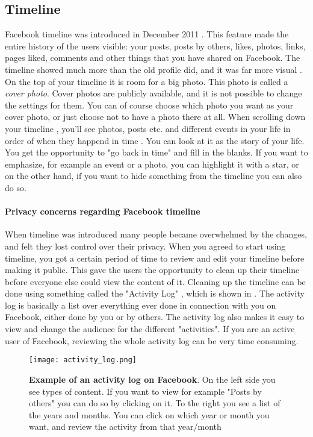 \subsection{Timeline}
\label{timeline}
Facebook timeline was introduced in December 2011 \cite{EvolutionOfFacebook}. This feature made the entire history of the users visible: your posts, posts by others, likes, photos, links, pages liked, comments and other things that you have shared on Facebook. The timeline showed much more than the old profile did, and it was far more visual \cite{timeline}. On the top of your timeline it is room for a big photo. This photo is called a \emph{cover photo}. Cover photos are publicly available, and it is not possible to change the settings for them. You can of course choose which photo you want as your cover photo, or just choose not to have a photo there at all. When scrolling down your timeline , you'll see photos, posts etc. and different events in your life in order of when they happend in time \cite{timeline}. You can look at it as the story of your life. You get the opportunity to "go back in time" and fill in the blanks. If you want to emphasize, for example an event or a photo, you can highlight it with a star, or on the other hand, if you want to hide something from the timeline you can also do so. 

\paragraph{Privacy concerns regarding Facebook timeline}
When timeline was introduced many people became overwhelmed by the changes, and felt they lost control over their privacy. When you agreed to start using timeline, you got a certain period of time to review and edit your timeline before making it public. This gave the users the opportunity to clean up their timeline before everyone else could view the content of it. Cleaning up the timeline can be done using something called the "Activity Log" \cite{activitylog}, which is shown in . The activity log is basically a list over everything ever done in connection with you on Facebook, either done by you or by others. The activity log also makes it easy to view and change the audience for the different "activities". If you are an active user of Facebook, reviewing the whole activity log can be very time consuming. 

\begin{figure}[h!]
\centering
\texttt{[image: activity\_log.png]}
\caption [Example of an activity log on Facebook.]{\textbf{Example of an activity log on Facebook}. On the left side you see types of content. If you want to view for example "Posts by others" you can do so by clicking on it. To the right you see a list of the years and months. You can click on which year or month you want, and review the activity from that year/month \cite{activitylog}} 
\label{fig:activitylog}
\end{figure}

